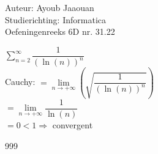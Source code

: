 \documentclass[a4paper]{article}
\begin{document}
\noindent \large Auteur: Ayoub Jaaouan \\
\noindent \large Studierichting: Informatica\\
\noindent \large Oefeningenreeks 6D nr. 31.22\\
\medskip

\normalsize

$\displaystyle\sum\limits_{n=2}^{\infty} \dfrac{1}{\left(\ln(n)\right)^n}$\\

Cauchy: $ = \lim\limits_{n \rightarrow +\infty}  \left(\sqrt{\dfrac{1}{\left(\ln(n)\right)^n}}\right)$\\

$ = \lim\limits_{n \rightarrow +\infty}  \dfrac{1}{\ln(n)}$\\

$= 0 < 1 \Rightarrow $ convergent


	


\begin{thebibliography}{999}
\end{thebibliography}
\end{document}
